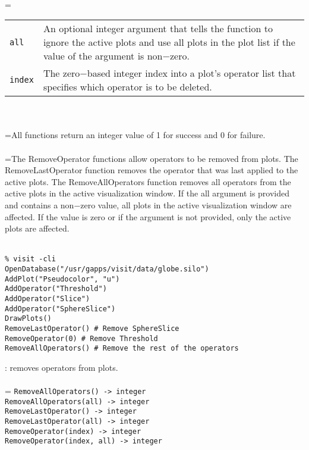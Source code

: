 \documentclass[10pt,a4paper]{report}
\begin{document}
 \\ 
\hangindent=\parindent 
\begin{tabular}{lp{9cm}}
\verb!all! & An optional integer argument that tells the function to ignore the active plots and use all plots in the plot list if the value of the argument is non$-$zero. \\
\verb!index! & The zero$-$based integer index into a plot's operator list that specifies which operator is to be deleted. \\
\end{tabular} \\[-2mm]


 \\ 
\hangindent=\parindent All functions return an integer value of 1 for success and 0 for failure. \\[-3mm] 

 \\ 
\hangindent=\parindent The RemoveOperator functions allow operators to be removed from plots. The RemoveLastOperator function removes the operator that was last applied to the active plots. The RemoveAllOperators function removes all operators from the active plots in the active visualization window. If the all argument is provided and contains a non$-$zero value, all plots in the active visualization window are affected. If the value is zero or if the argument is not provided, only the active plots are affected. \\[-3mm] 

\\[-6mm]
\begin{verbatim}% visit -cli
OpenDatabase("/usr/gapps/visit/data/globe.silo")
AddPlot("Pseudocolor", "u")
AddOperator("Threshold")
AddOperator("Slice")
AddOperator("SphereSlice")
DrawPlots()
RemoveLastOperator() # Remove SphereSlice
RemoveOperator(0) # Remove Threshold
RemoveAllOperators() # Remove the rest of the operators
\end{verbatim}
\newpage


{}
: removes operators from plots.\\[-3mm]

 \\ 
\hangindent=\parindent 
\verb!RemoveAllOperators() -> integer!\\ 
\verb!RemoveAllOperators(all) -> integer!\\ 
\verb!RemoveLastOperator() -> integer!\\ 
\verb!RemoveLastOperator(all) -> integer!\\ 
\verb!RemoveOperator(index) -> integer!\\ 
\verb!RemoveOperator(index, all) -> integer!\\ [-3mm]
\end{document}
